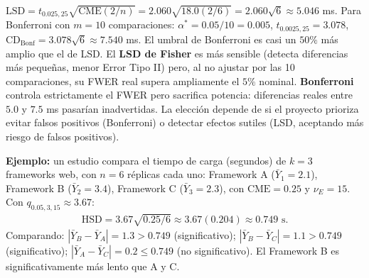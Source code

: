 \begin{solproblema}[prob:271e3ee]
	$\text{LSD} = t_{0.025,25}\sqrt{\text{CME}(2/n)} = 2.060\sqrt{18.0(2/6)} = 2.060\sqrt6 \approx5.046$ ms. Para Bonferroni con $m=10$ comparaciones: $\alpha^*=0.05/10=0.005$, $t_{0.0025,25}=3.078$, $\text{CD}_{\text{Bonf}}=3.078\sqrt6\approx7.540$ ms. El umbral de Bonferroni es casi un $50\%$ más amplio que el de LSD. El \textbf{LSD de Fisher} es más sensible (detecta diferencias más pequeñas, menor Error Tipo II) pero, al no ajustar por las 10 comparaciones, su FWER real supera ampliamente el $5\%$ nominal. \textbf{Bonferroni} controla estrictamente el FWER pero sacrifica potencia: diferencias reales entre $5.0$ y $7.5$ ms pasarían inadvertidas. La elección depende de si el proyecto prioriza evitar falsos positivos (Bonferroni) o detectar efectos sutiles (LSD, aceptando más riesgo de falsos positivos).
\end{solproblema}

\begin{solproblema}[prob:2ed3d37]
	\textbf{Ejemplo:} un estudio compara el tiempo de carga (segundos) de $k=3$ frameworks web, con $n=6$ réplicas cada uno: Framework A ($\bar Y_1=2.1$), Framework B ($\bar Y_2=3.4$), Framework C ($\bar Y_3=2.3$), con $\text{CME}=0.25$ y $\nu_E=15$. Con $q_{0.05,3,15}\approx3.67$:
	\begin{align*}
		\text{HSD} = 3.67\sqrt{0.25/6} \approx3.67(0.204)\approx0.749\text{ s}.
	\end{align*}
	Comparando: $|\bar Y_B-\bar Y_A|=1.3>0.749$ (significativo); $|\bar Y_B-\bar Y_C|=1.1>0.749$ (significativo); $|\bar Y_A-\bar Y_C|=0.2\le0.749$ (no significativo). El Framework B es significativamente más lento que A y C.
\end{solproblema}
